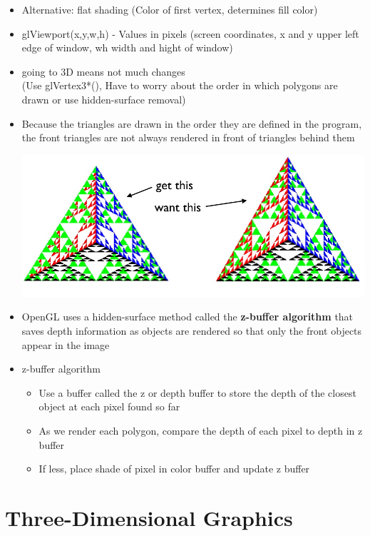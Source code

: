 \documentclass[11pt,a4paper]{article}
\begin{document}
\begin{itemize}
			\item Alternative: flat shading (Color of first vertex, determines fill color)

			\item glViewport(x,y,w,h) - Values in pixels (screen coordinates, x and y upper left edge of window, wh width and hight of window)
			\item going to 3D means not much changes\\
			(Use glVertex3*(), Have to worry about the order in which polygons are drawn or use hidden-surface removal)
			\item Because the triangles are drawn in the order they are defined in the program, the front triangles are not always rendered in front of triangles behind them\\
			\begin{center}
				\includegraphics[scale=0.5]{pictures/AlmostCorrect.jpg}
			\end{center}
			\item OpenGL uses a hidden-surface method called the \textbf{z-buffer algorithm} that saves depth information as objects are rendered so that only the front objects appear in the image
			\item z-buffer algorithm
				\begin{itemize}
					\item Use a buffer called the z or depth buffer to store the depth of the closest object at each pixel found so far
					\item As we render each polygon, compare the depth of each pixel to depth in z buffer
					\item If less, place shade of pixel in color buffer and update z buffer
				\end{itemize}
		\end{itemize}

		
\section{Three-Dimensional Graphics}
\end{document}
